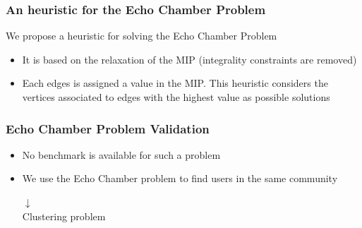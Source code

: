 \documentclass[aspectratio=169]{beamer}
\begin{document}
\begin{frame}[c]
	\frametitle{An heuristic for the Echo Chamber Problem}
	We propose a heuristic for solving the Echo Chamber Problem

	\begin{itemize}
		\item It is based on the relaxation of the MIP (integrality constraints
		      are removed)
		\item Each edges is assigned a value in the MIP. This heuristic
		      considers the vertices associated to edges with the highest value
		      as possible solutions
	\end{itemize}
\end{frame}

\begin{frame}[c]
	\frametitle{Echo Chamber Problem Validation}
	\begin{itemize}
		\item No benchmark is available for such a problem
		      \pause
		\item We use the Echo Chamber problem to find users in the same
		      community
		      \pause
		      \begin{center}
			      $\downarrow$ \\
			      Clustering problem
		      \end{center}
	\end{itemize}
\end{frame}

%
%
\end{document}
